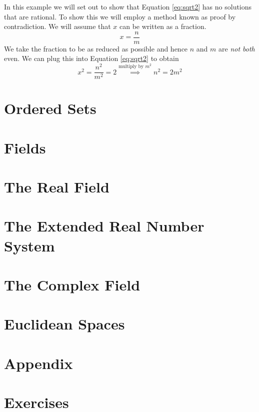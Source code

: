 \begin{example}\label{ex:gaps}
In this example we will set out to show that Equation \ref{eq:sqrt2} has no
solutions that are rational. To show this we will employ a method known as
proof by contradiction. We will assume that $x$ can be written as a fraction.
\begin{equation}\label{eq:sqrt2-is-rational}
    x = \frac{n}{m}
\end{equation}
We take the fraction to be as reduced as possible and hence $n$ and $m$ are \emph{not both} even. We can plug
this into Equation \ref{eq:sqrt2} to obtain
\begin{equation*}
x^2 = \frac{n^2}{m^2} = 2 \overset{\text{multiply by } m^2}{\implies} n^2 =
2m^2
\end{equation*}
\end{example}












\section{Ordered Sets}


\section{Fields}


\section{The Real Field}


\section{The Extended Real Number System}


\section{The Complex Field}


\section{Euclidean Spaces}


\section{Appendix}


\section{Exercises}

